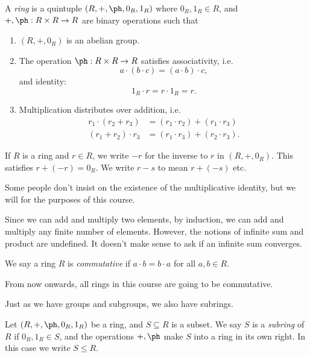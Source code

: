 \documentclass[a4paper]{article}
\begin{document}
\begin{defi}[Ring]
  A \emph{ring} is a quintuple $(R, +, \ph, 0_R, 1_R)$ where $0_R, 1_R \in R$, and $+, \ph: R \times R \to R$ are binary operations such that
  \begin{enumerate}
    \item $(R, +, 0_R)$ is an abelian group.
    \item The operation $\ph: R \times R \to R$ satisfies associativity, i.e.
      \[
        a\cdot (b\cdot c) = (a \cdot b)\cdot c,
      \]
      and identity:
      \[
        1_R \cdot r = r \cdot 1_R = r.
      \]
    \item Multiplication distributes over addition, i.e.
      \begin{align*}
        r_1 \cdot (r_2 + r_3) &= (r_1 \cdot r_2) + (r_1 \cdot r_3)\\
        (r_1 + r_2) \cdot r_3 &= (r_1 \cdot r_3) + (r_2 \cdot r_3).
      \end{align*}
  \end{enumerate}
\end{defi}

\begin{notation}
  If $R$ is a ring and $r \in R$, we write $-r$ for the inverse to $r$ in $(R, +, 0_R)$. This satisfies $r + (-r) = 0_R$. We write $r - s$ to mean $r + (-s)$ etc.
\end{notation}
Some people don't insist on the existence of the multiplicative identity, but we will for the purposes of this course.

Since we can add and multiply two elements, by induction, we can add and multiply any finite number of elements. However, the notions of infinite sum and product are undefined. It doesn't make sense to ask if an infinite sum converges.

\begin{defi}
  We say a ring $R$ is \emph{commutative} if $a \cdot b = b \cdot a$ for all $a, b \in R$.
\end{defi}
From now onwards, all rings in this course are going to be commutative.

Just as we have groups and subgroups, we also have subrings.
\begin{defi}[Subring]
  Let $(R, +, \ph, 0_R, 1_R)$ be a ring, and $S \subseteq R$ is a subset. We say $S$ is a \emph{subring} of $R$ if $0_R, 1_R \in S$, and the operations $+, \ph$ make $S$ into a ring in its own right. In this case we write $S \leq R$.
\end{defi}
\end{document}
